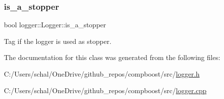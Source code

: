 \subsubsection{\texorpdfstring{is\+\_\+a\+\_\+stopper}{is\_a\_stopper}}
{\footnotesize\ttfamily bool logger\+::\+Logger\+::is\+\_\+a\+\_\+stopper\hspace{0.3cm}{\ttfamily [protected]}}



Tag if the logger is used as stopper. 



The documentation for this class was generated from the following files\+:\begin{DoxyCompactItemize}
\item 
C\+:/\+Users/schal/\+One\+Drive/github\+\_\+repos/compboost/src/\mbox{\hyperlink{logger_8h}{logger.\+h}}\item 
C\+:/\+Users/schal/\+One\+Drive/github\+\_\+repos/compboost/src/\mbox{\hyperlink{logger_8cpp}{logger.\+cpp}}\end{DoxyCompactItemize}
